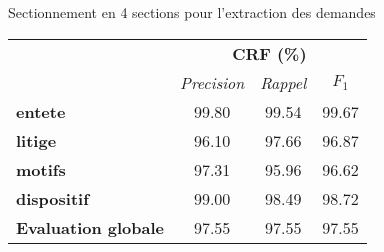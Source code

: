 \begin{frame}[t]{\mysubsectiontitle}
Sectionnement en 4 sections pour l'extraction des demandes

\centering
\begin{tabular}{|l|c|c|c|}
	\hline
	\multirow{2}{*}{}	&      \multicolumn{3}{|c|}{\textbf{CRF (\%)}}          \\ \cline{2-4} & \textit{Precision} & \textit{Rappel} & $F_1$ \\ \hline
	\textbf{entete} &   99.80 &	99.54 &	99.67      \\ 
	\textbf{litige}      &  96.10 &	97.66	& 96.87       \\ 
	\textbf{motifs}      &   97.31	&95.96	&96.62 \\
	\textbf{dispositif}    &   99.00&	98.49&	98.72  \\ \hline
	\textbf{Evaluation globale} &97.55	&97.55	&97.55       \\ \hline
\end{tabular}
\end{frame}
